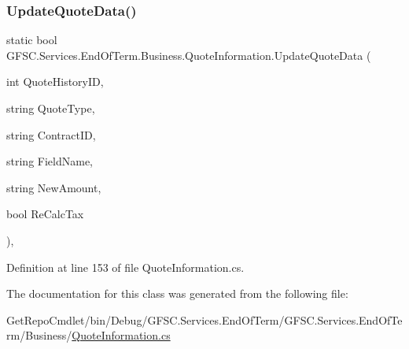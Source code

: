 \subsubsection{\texorpdfstring{Update\+Quote\+Data()}{UpdateQuoteData()}}
{\footnotesize\ttfamily static bool G\+F\+S\+C.\+Services.\+End\+Of\+Term.\+Business.\+Quote\+Information.\+Update\+Quote\+Data (\begin{DoxyParamCaption}\item[{int}]{Quote\+History\+ID,  }\item[{string}]{Quote\+Type,  }\item[{string}]{Contract\+ID,  }\item[{string}]{Field\+Name,  }\item[{string}]{New\+Amount,  }\item[{bool}]{Re\+Calc\+Tax }\end{DoxyParamCaption})\hspace{0.3cm}{\ttfamily [static]}, {\ttfamily [package]}}



Definition at line 153 of file Quote\+Information.\+cs.



The documentation for this class was generated from the following file\+:\begin{DoxyCompactItemize}
\item 
Get\+Repo\+Cmdlet/bin/\+Debug/\+G\+F\+S\+C.\+Services.\+End\+Of\+Term/\+G\+F\+S\+C.\+Services.\+End\+Of\+Term/\+Business/\mbox{\hyperlink{_business_2_quote_information_8cs}{Quote\+Information.\+cs}}\end{DoxyCompactItemize}

